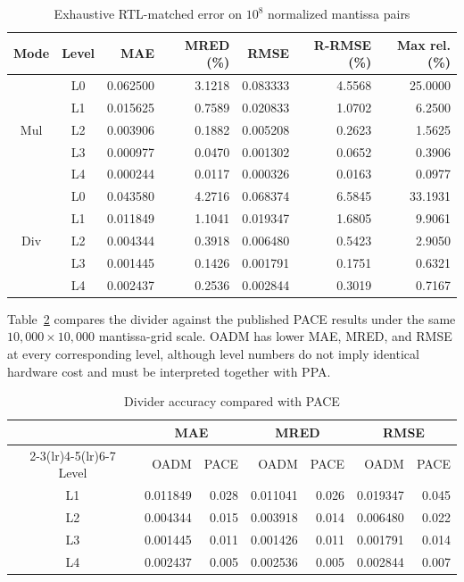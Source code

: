 \documentclass[conference]{IEEEtran}
\begin{document}
\begin{table}[t]
  \caption{Exhaustive RTL-matched error on $10^8$ normalized mantissa pairs}
  \label{tab:accuracy}
  \centering
  \small
  \begin{tabular}{ccrrrrr}
    \toprule
    Mode & Level & MAE & MRED (\%) & RMSE & R-RMSE (\%) & Max rel. (\%) \\
    \midrule
    \multirow{5}{*}{Mul}
      & L0 & 0.062500 & 3.1218 & 0.083333 & 4.5568 & 25.0000 \\
      & L1 & 0.015625 & 0.7589 & 0.020833 & 1.0702 & 6.2500 \\
      & L2 & 0.003906 & 0.1882 & 0.005208 & 0.2623 & 1.5625 \\
      & L3 & 0.000977 & 0.0470 & 0.001302 & 0.0652 & 0.3906 \\
      & L4 & 0.000244 & 0.0117 & 0.000326 & 0.0163 & 0.0977 \\
    \midrule
    \multirow{5}{*}{Div}
      & L0 & 0.043580 & 4.2716 & 0.068374 & 6.5845 & 33.1931 \\
      & L1 & 0.011849 & 1.1041 & 0.019347 & 1.6805 & 9.9061 \\
      & L2 & 0.004344 & 0.3918 & 0.006480 & 0.5423 & 2.9050 \\
      & L3 & 0.001445 & 0.1426 & 0.001791 & 0.1751 & 0.6321 \\
      & L4 & 0.002437 & 0.2536 & 0.002844 & 0.3019 & 0.7167 \\
    \bottomrule
  \end{tabular}
\end{table}

Table~\ref{tab:pace-accuracy} compares the divider against the published PACE
results under the same $10{,}000\times10{,}000$ mantissa-grid scale. OADM has
lower MAE, MRED, and RMSE at every corresponding level, although level numbers
do not imply identical hardware cost and must be interpreted together with PPA.

\begin{table}[t]
  \caption{Divider accuracy compared with PACE \cite{wen2024pace}}
  \label{tab:pace-accuracy}
  \centering
  \small
  \begin{tabular}{crrrrrr}
    \toprule
    & \multicolumn{2}{c}{MAE} & \multicolumn{2}{c}{MRED}
    & \multicolumn{2}{c}{RMSE} \\
    \cmidrule(lr){2-3}\cmidrule(lr){4-5}\cmidrule(lr){6-7}
    Level & OADM & PACE & OADM & PACE & OADM & PACE \\
    \midrule
    L1 & 0.011849 & 0.028 & 0.011041 & 0.026 & 0.019347 & 0.045 \\
    L2 & 0.004344 & 0.015 & 0.003918 & 0.014 & 0.006480 & 0.022 \\
    L3 & 0.001445 & 0.011 & 0.001426 & 0.011 & 0.001791 & 0.014 \\
    L4 & 0.002437 & 0.005 & 0.002536 & 0.005 & 0.002844 & 0.007 \\
    \bottomrule
  \end{tabular}
\end{table}
\end{document}
